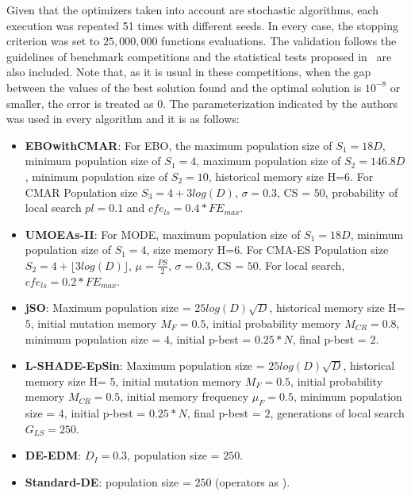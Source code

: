 Given that the optimizers taken into account are stochastic algorithms, each execution was repeated 51 times with different seeds.
%
In every case, the stopping criterion was set to $25,000,000$ functions evaluations.
%
The validation follows the guidelines of \CEC{} benchmark competitions and the statistical tests proposed in~\cite{Joel:StatisticalTest} are also included.
%
%
%
Note that, as it is usual in these competitions, when the gap between the values of the best solution found and the optimal solution is $10^{-8}$ or smaller, 
the error is treated as $0$.
%
%
The parameterization indicated by the authors was used in every algorithm and it is as follows:
\begin{itemize}
\item \textbf{EBOwithCMAR}: For EBO, the maximum population size of $S_1 = 18D$, minimum population size of $S_1 = 4$, maximum population size of $S_2 = 146.8D$, minimum population size of $S_2 = 10$, historical memory size H=$6$. For CMAR Population size $S_3 = 4 + 3log(D)$, $\sigma=0.3$, CS = $50$, probability of local search $pl = 0.1$ and $cfe_{ls} = 0.4* FE_{max}$.
\item \textbf{UMOEAs-II}: For MODE, maximum population size of $S_1 = 18D$, minimum population size of $S_1 = 4$, size memory H=$6$. For CMA-ES Population size $S_2 = 4 + \lfloor 3log(D) \rfloor$, $\mu=\frac{PS}{2}$, $\sigma=0.3$, CS = $50$. For local search, $cfe_{ls} = 0.2 * FE_{max}$.
\item \textbf{jSO}: Maximum population size = $25log(D)\sqrt{D}$, historical memory size H= $5$, initial mutation memory $M_F = 0.5$, initial probability memory $M_{CR} = 0.8$, minimum population size = $4$, initial p-best = $0.25*N$, final p-best = $2$.
\item \textbf{L-SHADE-EpSin}: Maximum population size = $25log(D)\sqrt{D}$, historical memory size H= $5$, initial mutation memory $M_F = 0.5$, initial probability memory $M_{CR} = 0.5$, initial memory frequency $\mu_F = 0.5$, minimum population size = $4$, initial p-best = $0.25*N$, final p-best = $2$, generations of local search $G_{LS}=250$.
\item \textbf{ DE-EDM}: $D_I = 0.3$, population size = $250$.
\item \textbf{ Standard-DE}: population size = $250$ (operators as \DEEDM{}).
\end{itemize}
%

